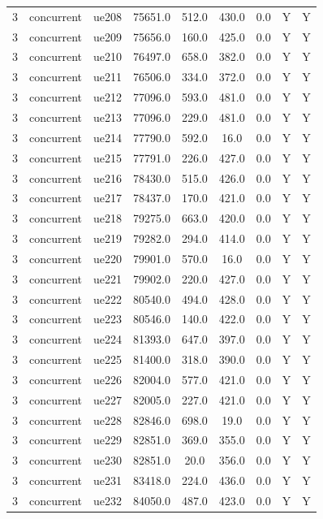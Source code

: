 \begin{table}[ht]
\begin{tabular}{|c|c|c|c|c|c|c|c|c|}
3 & concurrent & ue208 & 75651.0 & 512.0 & 430.0 & 0.0 & Y & Y \\
3 & concurrent & ue209 & 75656.0 & 160.0 & 425.0 & 0.0 & Y & Y \\
3 & concurrent & ue210 & 76497.0 & 658.0 & 382.0 & 0.0 & Y & Y \\
3 & concurrent & ue211 & 76506.0 & 334.0 & 372.0 & 0.0 & Y & Y \\
3 & concurrent & ue212 & 77096.0 & 593.0 & 481.0 & 0.0 & Y & Y \\
3 & concurrent & ue213 & 77096.0 & 229.0 & 481.0 & 0.0 & Y & Y \\
3 & concurrent & ue214 & 77790.0 & 592.0 & 16.0 & 0.0 & Y & Y \\
3 & concurrent & ue215 & 77791.0 & 226.0 & 427.0 & 0.0 & Y & Y \\
3 & concurrent & ue216 & 78430.0 & 515.0 & 426.0 & 0.0 & Y & Y \\
3 & concurrent & ue217 & 78437.0 & 170.0 & 421.0 & 0.0 & Y & Y \\
3 & concurrent & ue218 & 79275.0 & 663.0 & 420.0 & 0.0 & Y & Y \\
3 & concurrent & ue219 & 79282.0 & 294.0 & 414.0 & 0.0 & Y & Y \\
3 & concurrent & ue220 & 79901.0 & 570.0 & 16.0 & 0.0 & Y & Y \\
3 & concurrent & ue221 & 79902.0 & 220.0 & 427.0 & 0.0 & Y & Y \\
3 & concurrent & ue222 & 80540.0 & 494.0 & 428.0 & 0.0 & Y & Y \\
3 & concurrent & ue223 & 80546.0 & 140.0 & 422.0 & 0.0 & Y & Y \\
3 & concurrent & ue224 & 81393.0 & 647.0 & 397.0 & 0.0 & Y & Y \\
3 & concurrent & ue225 & 81400.0 & 318.0 & 390.0 & 0.0 & Y & Y \\
3 & concurrent & ue226 & 82004.0 & 577.0 & 421.0 & 0.0 & Y & Y \\
3 & concurrent & ue227 & 82005.0 & 227.0 & 421.0 & 0.0 & Y & Y \\
3 & concurrent & ue228 & 82846.0 & 698.0 & 19.0 & 0.0 & Y & Y \\
3 & concurrent & ue229 & 82851.0 & 369.0 & 355.0 & 0.0 & Y & Y \\
3 & concurrent & ue230 & 82851.0 & 20.0 & 356.0 & 0.0 & Y & Y \\
3 & concurrent & ue231 & 83418.0 & 224.0 & 436.0 & 0.0 & Y & Y \\
3 & concurrent & ue232 & 84050.0 & 487.0 & 423.0 & 0.0 & Y & Y \\

\end{tabular}
\end{table}
